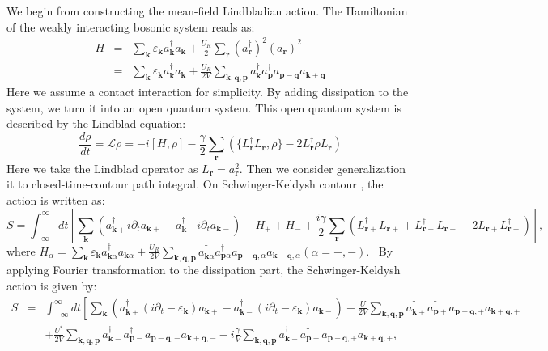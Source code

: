 \documentclass[aps,superscriptaddress,notitlepage,longbibliography]{revtex4-1}
\begin{document}
We begin from constructing the mean-field Lindbladian action. The
Hamiltonian of the weakly interacting bosonic system reads as: 
\begin{eqnarray}
H & = & \sum_{\bm{k}}\varepsilon_{\bm{k}}a_{\bm{k}}^{\dagger}a_{\bm{k}}+\frac{U_{R}}{2}\sum_{\bm{r}}(a_{\bm{r}}^{\dagger})^{2}(a_{\bm{r}})^{2}\nonumber \\
 & = & \sum_{\bm{k}}\varepsilon_{\bm{k}}a_{\bm{k}}^{\dagger}a_{\bm{k}}+\frac{U_{R}}{2V}\sum_{\bm{k},\bm{q},\bm{p}}a_{\bm{k}}^{\dagger}a_{\bm{p}}^{\dagger}a_{\bm{p}-\bm{q}}a_{\bm{k}+\bm{q}}\label{Hamiltonian}
\end{eqnarray}
Here we assume a contact interaction for simplicity. By adding dissipation
to the system, we turn it into an open quantum system. This open quantum
system is described by the Lindblad equation: 
\begin{equation}
\frac{d\rho}{dt}=\mathcal{L}\rho=-i[H,\rho]-\frac{\gamma}{2}\sum_{\bm{r}}(\{L_{\bm{r}}^{\dagger}L_{\bm{r}},\rho\}-2L_{\bm{r}}^{\dagger}\rho L_{\bm{r}})\label{Lindbland}
\end{equation}
Here we take the Lindblad operator as $L_{\bm{r}}=a_{\bm{r}}^{2}$.
Then we consider generalization it to closed-time-contour path integral.
On Schwinger-Keldysh contour \citep{Sieberer_2016}, the action is
written as: 
\begin{equation}
S=\int_{-\infty}^{\infty}dt\left[\sum_{\bm{k}}(a_{\bm{k}+}^{\dagger}i\partial_{t}a_{\bm{k}+}-a_{\bm{k}-}^{\dagger}i\partial_{t}a_{\bm{k}-})-H_{+}+H_{-}+\frac{i\gamma}{2}\sum_{\bm{r}}(L_{\bm{r}+}^{\dagger}L_{\bm{r}+}+L_{\bm{r}-}^{\dagger}L_{\bm{r}-}-2L_{\bm{r}+}L_{\bm{r}-}^{\dagger})\right],
\end{equation}
where $H_{\alpha}=\sum_{\bm{k}}\varepsilon_{\bm{k}}a_{\bm{k}\alpha}^{\dagger}a_{\bm{k}\alpha}+\frac{U_{R}}{2V}\sum_{\bm{k},\bm{q},\bm{p}}a_{\bm{k}\alpha}^{\dagger}a_{\bm{p}\alpha}^{\dagger}a_{\bm{p}-\bm{q},\alpha}a_{\bm{k}+\bm{q},\alpha}(\alpha=+,-)$.
\ By applying Fourier transformation to the dissipation part, the
Schwinger-Keldysh action is given by: 
\begin{eqnarray}
S & = & \int_{-\infty}^{\infty}dt\left[\sum_{\bm{k}}(a_{\bm{k}+}^{\dagger}(i\partial_{t}-\varepsilon_{\bm{k}})a_{\bm{k}+}-a_{\bm{k}-}^{\dagger}(i\partial_{t}-\varepsilon_{\bm{k}})a_{\bm{k}-})-\frac{U}{2V}\sum_{\bm{k},\bm{q},\bm{p}}a_{\bm{k}+}^{\dagger}a_{\bm{p}+}^{\dagger}a_{\bm{p}-\bm{q},+}a_{\bm{k}+\bm{q},+}\right.\nonumber \\
 &  & +\frac{U^{\ast}}{2V}\sum_{\bm{k},\bm{q},\bm{p}}a_{\bm{k}-}^{\dagger}a_{\bm{p}-}^{\dagger}a_{\bm{p}-\bm{q},-}a_{\bm{k}+\bm{q},-}-i\frac{\gamma}{V}\sum_{\bm{k},\bm{q},\bm{p}}a_{\bm{k}-}^{\dagger}a_{\bm{p}-}^{\dagger}a_{\bm{p}-\bm{q},+}a_{\bm{k}+\bm{q},+},
\end{eqnarray}
\end{document}
